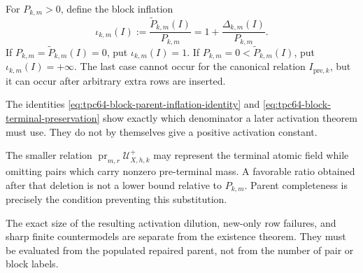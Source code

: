 For \(P_{k,m}>0\), define the block inflation
\begin{equation}
 \iota_{k,m}(I)
 :=\frac{\widetilde P_{k,m}(I)}{P_{k,m}}
 =1+\frac{\Delta_{k,m}(I)}{P_{k,m}}.
 \label{eq:tpc64-block-inflation-factor}
\end{equation}
If \(P_{k,m}=\widetilde P_{k,m}(I)=0\), put
\(\iota_{k,m}(I)=1\).  If
\(P_{k,m}=0<\widetilde P_{k,m}(I)\), put
\(\iota_{k,m}(I)=+\infty\).  The last case cannot occur for the canonical
relation \(I_{\mathrm{pre},k}\), but it can occur after arbitrary extra
rows are inserted.

The identities
\eqref{eq:tpc64-block-parent-inflation-identity} and
\eqref{eq:tpc64-block-terminal-preservation} show exactly which
denominator a later activation theorem must use.  They do not by
themselves give a positive activation constant.

\begin{remark}
\label{rem:tpc64-terminal-only-relation}
The smaller relation
\(\operatorname{pr}_{m,r}\mathcal U_{X,h,k}^{+}\) may represent the
terminal atomic field while omitting pairs which carry nonzero
pre-terminal mass.  A favorable ratio obtained after that deletion is not
a lower bound relative to \(P_{k,m}\).  Parent completeness is precisely
the condition preventing this substitution.
\end{remark}

The exact size of the resulting activation dilution, new-only row
failures, and sharp finite countermodels are separate from the existence
theorem.  They must be evaluated from the populated repaired parent, not
from the number of pair or block labels.
